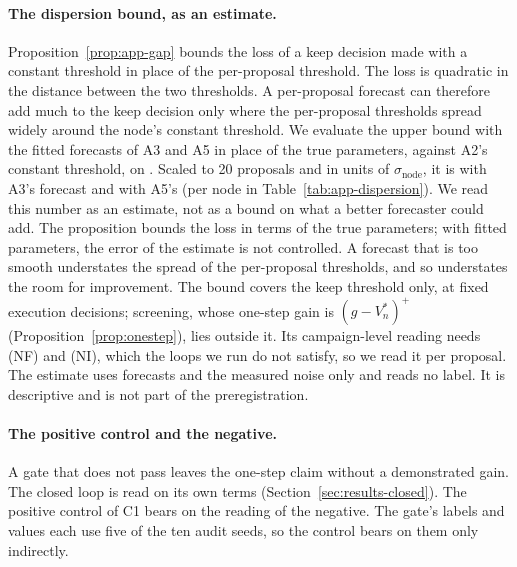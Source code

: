 \paragraph{The dispersion bound, as an estimate.}
Proposition~\ref{prop:app-gap} bounds the loss of a keep decision made with a constant threshold in place of the per-proposal threshold. The loss is quadratic in the distance between the two thresholds. A per-proposal forecast can therefore add much to the keep decision only where the per-proposal thresholds spread widely around the node's constant threshold. We evaluate the upper bound with the fitted forecasts of A3 and A5 in place of the true parameters, against A2's constant threshold, on . Scaled to 20 proposals and in units of $\sigma_{\mathrm{node}}$, it is \DispBoundAThree{} with A3's forecast and \DispBoundAFive{} with A5's (per node in Table~\ref{tab:app-dispersion}). We read this number as an estimate, not as a bound on what a better forecaster could add. The proposition bounds the loss in terms of the true parameters; with fitted parameters, the error of the estimate is not controlled. A forecast that is too smooth understates the spread of the per-proposal thresholds, and so understates the room for improvement. The bound covers the keep threshold only, at fixed execution decisions; screening, whose one-step gain is $(g-V^*_n)^+$ (Proposition~\ref{prop:onestep}), lies outside it. Its campaign-level reading needs (NF) and (NI), which the loops we run do not satisfy, so we read it per proposal. The estimate uses forecasts and the measured noise only and reads no label. It is descriptive and is not part of the preregistration. 

\paragraph{The positive control and the negative.}
A gate that does not pass leaves the one-step claim without a demonstrated gain. The closed loop is read on its own terms (Section~\ref{sec:results-closed}). The positive control of C1 bears on the reading of the negative.  The gate's labels and values each use five of the ten audit seeds, so the control bears on them only indirectly.
\fi

